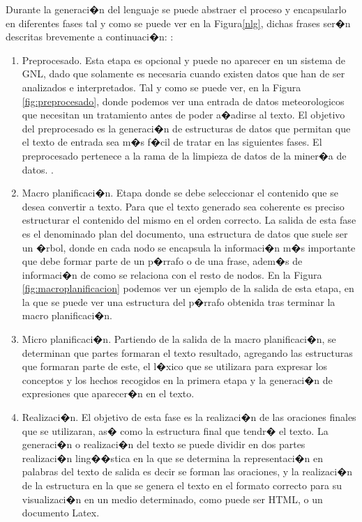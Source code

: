 Durante la generaci�n del lenguaje se puede abstraer el proceso y encapsularlo en diferentes fases tal y como se puede ver en la Figura\ref{nlg}, dichas frases ser�n descritas brevemente a continuaci�n: \citep{VICENTE2015}:


\begin{enumerate}
\item Preprocesado. Esta etapa es opcional y puede no aparecer en un sistema de GNL, dado que solamente es necesaria cuando existen datos que han de ser analizados e interpretados. Tal y como se puede ver, en la Figura \ref{fig:preprocesado}, donde podemos ver una entrada de datos meteorologicos que necesitan un tratamiento antes de poder a�adirse al texto. El objetivo del preprocesado es la generaci�n de estructuras de datos que permitan que el texto de entrada sea m�s f�cil de tratar en las siguientes fases. El preprocesado pertenece a la rama de la limpieza de datos de la miner�a de datos.  \citep{Han2005}.

\item Macro planificaci�n. Etapa donde se debe seleccionar el contenido que se desea convertir a texto. Para que el texto generado sea coherente es preciso estructurar el contenido del mismo en el orden correcto. La salida de esta fase es el denominado plan del documento, una estructura de datos que suele ser un �rbol, donde en cada nodo se encapsula la informaci�n m�s importante que debe formar parte de un p�rrafo o de una frase, adem�s de informaci�n de como se relaciona con el resto de nodos. En la Figura \ref{fig:macroplanificacion} podemos ver un ejemplo de la salida de esta etapa, en la que se puede ver una estructura del p�rrafo obtenida tras terminar la macro planificaci�n.
\item Micro planificaci�n. Partiendo de la salida de la macro planificaci�n, se determinan que partes formaran el texto resultado, agregando las estructuras que formaran parte de este, el l�xico que se utilizara para expresar los conceptos y los hechos recogidos en la primera etapa y la generaci�n de expresiones que aparecer�n en el texto.  
\item Realizaci�n. El objetivo de esta fase es la realizaci�n de las oraciones finales que se utilizaran, as� como la estructura final que tendr� el texto. La generaci�n o realizaci�n del texto se puede dividir en dos partes realizaci�n ling��stica en la que se determina la representaci�n en palabras del texto de salida es decir se forman las oraciones, y la realizaci�n de la estructura en la que se genera el texto en el formato correcto para su visualizaci�n en un medio determinado, como puede ser HTML, o un documento Latex.

\end{enumerate}
